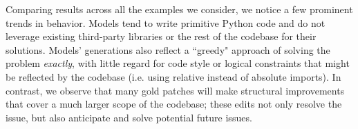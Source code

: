 Comparing results across all the examples we consider, we notice a few prominent trends in behavior.
Models tend to write primitive Python code and do not leverage existing third-party libraries or the rest of the codebase for their solutions.
Models' generations also reflect a ``greedy" approach of solving the problem \textit{exactly}, with little regard for code style or logical constraints that might be reflected by the codebase (i.e. using relative instead of absolute imports).
In contrast, we observe that many gold patches will make structural improvements that cover a much larger scope of the codebase; these edits not only resolve the issue, but also anticipate and solve potential future issues.
